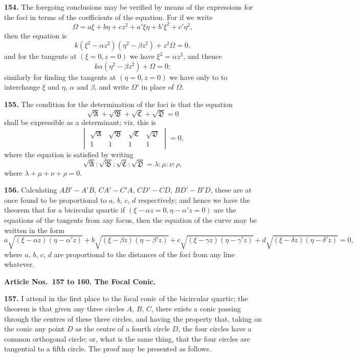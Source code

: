 \documentclass[12pt,a4paper]{article}
\theoremstyle{definition}
\begin{document}
\newpage
\noindent\textbf{154.} The foregoing conclusions may be verified by means of the expressions
for the foci in terms of the coefficients of the equation. For if we write
\[
\Omega = a\xi + b\eta + cz^2 + a'\xi\eta + b'\xi^2 + c'\eta^2,
\]
then the equation is
\[
k(\xi^2 - \alpha z^2)(\eta^2 - \beta z^2) + z^2\Omega = 0,
\]
and for the tangents at $(\xi = 0, z = 0)$ we have $\xi^2 = \alpha z^2$, and thence
\[
k\alpha(\eta^2 - \beta z^2) + \Omega = 0;
\]
similarly for finding the tangents at $(\eta = 0, z = 0)$ we have only to to interchange
$\xi$ and $\eta$, $\alpha$ and $\beta$, and write $\Omega'$ in place of $\Omega$.

\noindent\textbf{155.} The condition for the determination of the foci is that the equation
\[
\sqrt{\mathfrak{A}} + \sqrt{\mathfrak{B}} + \sqrt{\mathfrak{C}} + \sqrt{\mathfrak{D}} = 0
\]
shall be expressible as a determinant; viz. this is
\[
\begin{vmatrix}
\sqrt{\mathfrak{A}} & \sqrt{\mathfrak{B}} & \sqrt{\mathfrak{C}} & \sqrt{\mathfrak{D}} \\
1 & 1 & 1 & 1
\end{vmatrix}
= 0,
\]
where the equation is satisfied by writing
\[
\sqrt{\mathfrak{A}} : \sqrt{\mathfrak{B}} : \sqrt{\mathfrak{C}} : \sqrt{\mathfrak{D}}
= \lambda : \mu : \nu : \rho,
\]
where $\lambda + \mu + \nu + \rho = 0$.

\newpage
\noindent\textbf{156.} Calculating $AB' - A'B$, $CA' - C'A$, $CD' - CD$, $BD' - B'D$, these are at once
found to be proportional to $a$, $b$, $c$, $d$ respectively; and hence we have the theorem
that for a bicircular quartic if $(\xi - \alpha z = 0, \eta - \alpha'z = 0)$ are the equations of the
tangents from any focus, then the equation of the curve may be written in the form
\[
a\sqrt{(\xi - \alpha z)(\eta - \alpha'z)} + b\sqrt{(\xi - \beta z)(\eta - \beta'z)} + c\sqrt{(\xi - \gamma z)(\eta - \gamma'z)} + d\sqrt{(\xi - \delta z)(\eta - \delta'z)} = 0,
\]
where $a$, $b$, $c$, $d$ are proportional to the distances of the foci from any line whatever.

\vspace{0.5em}
\noindent\textbf{Article Nos.~157 to 160. The Focal Conic.}

\vspace{0.3em}
\noindent\textbf{157.} I attend in the first place to the focal conic of the bicircular quartic;
the theorem is that given any three circles $A$, $B$, $C$, there exists a conic passing
through the centres of these three circles, and having the property that, taking on the
conic any point $D$ as the centre of a fourth circle $D$, the four circles have a common
orthogonal circle; or, what is the same thing, that the four circles are tangential to a
fifth circle. The proof may be presented as follows.
\end{document}
